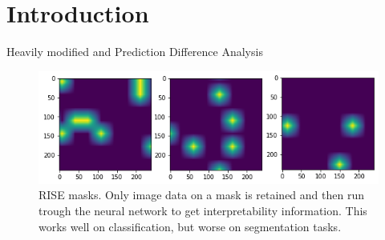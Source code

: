 \section{Introduction}
Heavily modified \cite{zeiler2014visualizing} and 
Prediction Difference Analysis \cite{zintgraf2017visualizing}


\begin{figure}[H]
\centering
\includegraphics[width=14cm]{chapters/02_methods/images/rise-masks.png}
\caption{RISE masks. Only image data on a mask is retained and then run trough the neural network to get interpretability information. This works well on classification, but worse on segmentation tasks.}
\end{figure}
